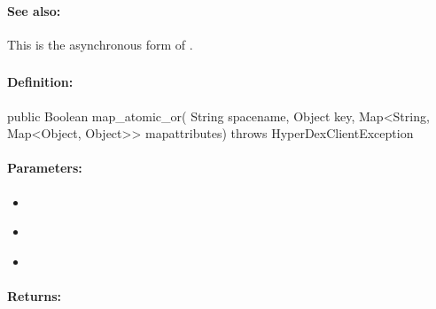 \paragraph{See also:}  This is the asynchronous form of .

\pagebreak
\subsubsection{}
\label{api:java:map_atomic_or}


\paragraph{Definition:}
\begin{javacode}
public Boolean map_atomic_or(
        String spacename,
        Object key,
        Map<String, Map<Object, Object>> mapattributes) throws HyperDexClientException
\end{javacode}

\paragraph{Parameters:}
\begin{itemize}[noitemsep]
\item {}\\

\item {}\\

\item {}\\

\end{itemize}

\paragraph{Returns:}


\pagebreak
\subsubsection{}
\label{api:java:async_map_atomic_or}


